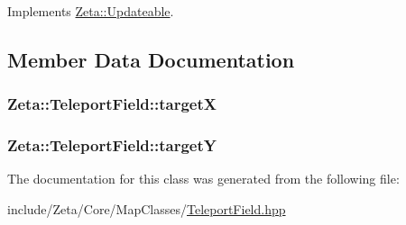 Implements \hyperlink{classZeta_1_1Updateable_af4006bfccb762454b4da08786ad93de0}{Zeta\+::\+Updateable}.



\subsection{Member Data Documentation}
\hypertarget{classZeta_1_1TeleportField_ab2862eb499f66d91c7594f01e141d48b}{
\subsubsection[{target\+X}]{ Zeta\+::\+Teleport\+Field\+::target\+X\hspace{0.3cm}{\ttfamily [private]}}}\label{classZeta_1_1TeleportField_ab2862eb499f66d91c7594f01e141d48b}
\hypertarget{classZeta_1_1TeleportField_a71ec5c1808f550d6e11c4fb889776d49}{
\subsubsection[{target\+Y}]{ Zeta\+::\+Teleport\+Field\+::target\+Y\hspace{0.3cm}{\ttfamily [private]}}}\label{classZeta_1_1TeleportField_a71ec5c1808f550d6e11c4fb889776d49}


The documentation for this class was generated from the following file\+:\begin{DoxyCompactItemize}
\item 
include/\+Zeta/\+Core/\+Map\+Classes/\hyperlink{TeleportField_8hpp}{Teleport\+Field.\+hpp}\end{DoxyCompactItemize}
